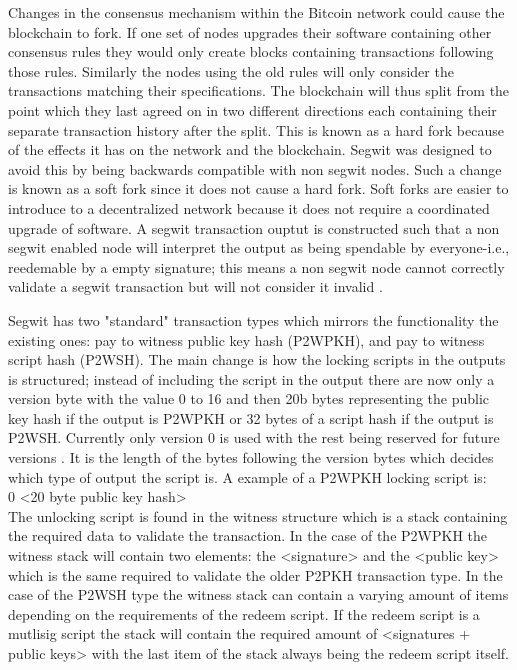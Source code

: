 Changes in the consensus mechanism within the Bitcoin network could cause the blockchain to fork. If one set of nodes upgrades their software containing other consensus rules they would only create blocks containing transactions following those rules. Similarly the nodes using the old rules will only consider the transactions matching their specifications. The blockchain will thus split from the point which they last agreed on in two different directions each containing their separate transaction history after the split. This is known as a hard fork because of the effects it has on the network and the blockchain. Segwit was designed to avoid this by being backwards compatible with non segwit nodes. Such a change is known as a soft fork since it does not cause a hard fork. Soft forks are easier to introduce to a decentralized network because it does not require a coordinated upgrade of software. A segwit transaction ouptut is constructed such that a non segwit enabled node will interpret the output as being spendable by everyone-i.e., reedemable by a empty signature; this means a non segwit node cannot correctly validate a segwit transaction but will not consider it invalid \cite{antonopoulos2017mastering}. 

Segwit has two "standard" transaction types which mirrors the functionality the existing ones: pay to witness public key hash (P2WPKH), and pay to witness script hash (P2WSH). The main change is how the locking scripts in the outputs is structured; instead of including the script in the output there are now only a version byte with the value 0 to 16 and then 20b bytes representing the public key hash if the output is P2WPKH or 32 bytes of a script hash if the output is P2WSH. Currently only version 0 is used with the rest being reserved for future versions \cite{BIP141}. It is the length of the bytes following the version bytes which decides which type of output the script is. A example of a P2WPKH locking script is:
\\

0 <20 byte public key hash>
\\

The unlocking script is found in the witness structure which is a stack containing the required data to validate the transaction.
In the case of the P2WPKH the witness stack will contain two elements: the <signature> and the <public key> which is the same required to validate the older P2PKH transaction type. In the case of the P2WSH type the witness stack can contain a varying amount of items depending on the requirements of the redeem script. If the redeem script is a mutlisig script the stack will contain the required amount of <signatures + public keys> with the last item of the stack always being the redeem script itself.

